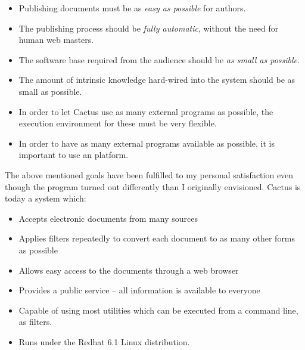 \begin{itemize}
\item Publishing documents must be as \textit{easy as
    possible} for authors.

\item The publishing process should be \textit{fully
    automatic}, without the need for human web masters.

\item The software base required from the audience should be
  \textit{as small as possible}.

\item The amount of intrinsic knowledge hard-wired into the
  system should be as small as possible.

\item In order to let Cactus use as many external programs as
  possible, the execution environment for these must be very
  flexible.

\item In order to have as many external programs available as
  possible, it is important to use an
   platform.  
\end{itemize}

The above mentioned goals have been fulfilled to my
personal satisfaction even though the program turned out
differently than I originally envisioned. Cactus is today a
system which:

\begin{itemize}

\item Accepts electronic documents from many sources

\item Applies filters repeatedly to convert each document to
  as many other forms as possible

\item Allows easy access to the documents through a web
  browser

\item Provides a public service -- all information is
  available to everyone


\item Capable of using most utilities which can be executed from a
  command line, as filters.

\item Runs under the Redhat 6.1 Linux distribution.  
\end{itemize}

